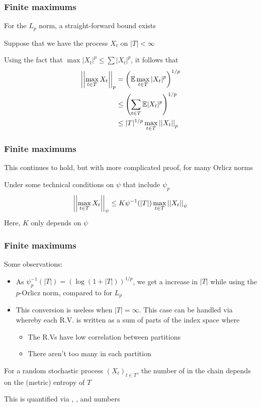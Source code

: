 \documentclass[12pt]{beamer}
\begin{document}
\begin{frame}[fragile]
\frametitle{Finite maximums}
For the $L_p$ norm, a straight-forward bound exists

\vsp
Suppose that we have the process $X_t$ on $|T| < \infty$

\vsp
Using the fact that $\max |X_t|^p \leq \sum |X_t|^p$, it follows that
\begin{align*}
\left|\left| \max_{t \in T} X_t \right|\right|_p 
& =
\left( \mathbb{E} \max_{t\in T} |X_t|^p \right)^{1/p}  \\
& \leq 
\left(  \sum_{t\in T} \mathbb{E}|X_t|^p \right)^{1/p}  \\
 & \leq
|T|^{1/p} \max_{t\in T} \left|\left| X_t \right|\right|_p 
\end{align*}
\end{frame}

\begin{frame}[fragile]
\frametitle{Finite maximums}
This continues to hold, but with more complicated proof, for many Orlicz norms

\vsp
Under some technical conditions on $\psi$ that include $\psi_p$ 
\[
\left|\left| \max_{t \in T} X_t \right|\right|_\psi \leq K \psi^{-1}(|T|) \max_{t \in T} \left|\left| X_t \right|\right|_\psi
\]
Here, $K$ only depends on $\psi$
\end{frame}

\begin{frame}[fragile]
\frametitle{Finite maximums}
Some observations:

\begin{itemize}

\item As $\psi_p^{-1}(|T|) = (\log(1+|T|))^{1/p}$, we get a  increase in $|T|$ while using the $p$-Orlicz norm,
compared to  for $L_p$

\item 
This conversion is useless when $|T| = \infty$.  This case can be handled via  whereby each R.V.
is written as a sum of parts of the index space where
\begin{itemize}
\item The R.Vs have low correlation between partitions
\item There aren't too many in each partition
\end{itemize}
\end{itemize}
For a random stochastic process $(X_t)_{t\in T}$, the number of  in the chain depends on the (metric) entropy
of $T$

\vsp
This is quantified via , , and  numbers
\end{frame}
\end{document}
